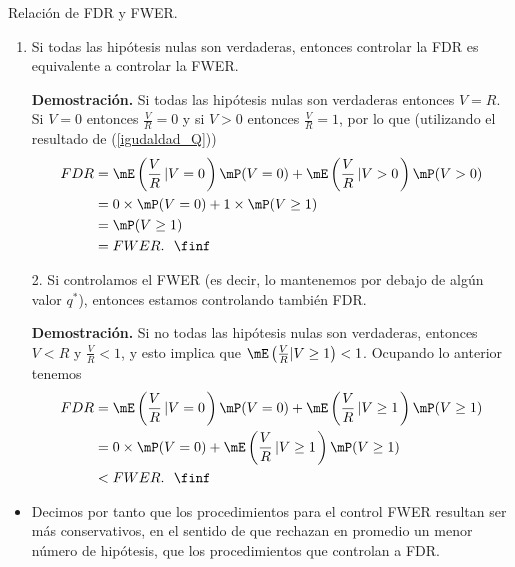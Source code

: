 \begin{frame}{Relación de FDR y FWER.}
	\begin{enumerate}[<+- | alert@+>]
		
		\item Si todas las hipótesis nulas son verdaderas, entonces controlar la FDR es equivalente a controlar la FWER.
		\item[] \textbf{Demostración.} Si todas las hipótesis nulas son verdaderas entonces $V=R$. Si $V=0$ entonces $\frac{V}{R}=0$ y si $V>0$ entonces $\frac{V}{R}=1$, por lo que (utilizando el resultado de (\ref{igudaldad_Q}))
            \begin{align*}
            FDR &= \mE\left( \frac{V}{R}\left| V=0\right. \right)\mP(V=0)+\mE\left( \frac{V}{R}\left| V>0\right. \right)\mP(V>0)\\
            &=0\times \mP(V=0)+1\times \mP(V\geq 1)\\
            &= \mP(V\geq 1)\\
            &= FWER.\ \ \finf
            \end{align*}

	\end{enumerate}
\end{frame}

\begin{frame}
	\begin{enumerate}[<+- | alert@+>]
		\item[2.] Si controlamos el FWER (es decir, lo mantenemos por debajo de algún valor $q^*$), entonces estamos controlando también FDR.
		\item[] \textbf{Demostración.} Si no todas las hipótesis nulas son verdaderas, entonces $V<R$ y  $\frac{V}{R}<1$, y esto implica que $\mE\left( \frac{V}{R} |V\geq 1\right)<1$. Ocupando lo anterior tenemos
            \begin{align*}
                FDR&= \mE\left( \frac{V}{R}\left| V=0\right. \right)\mP(V=0)+\mE\left( \frac{V}{R}\left| V\geq 1\right. \right)\mP(V\geq 1)\\
                &=0\times \mP(V=0)+\mE\left( \frac{V}{R}\left| V\geq 1\right. \right)\mP(V\geq 1)\\
                &<FWER.\ \ \finf
            \end{align*}
	\end{enumerate}
\end{frame}

\begin{frame}
	\begin{itemize}[<+- | alert@+>]
		
		\item Decimos por tanto que los procedimientos para el control FWER resultan ser más conservativos, en el sentido de que rechazan en promedio un menor número de hipótesis, que los procedimientos que controlan a FDR. 
		
	\end{itemize}

\end{frame}


